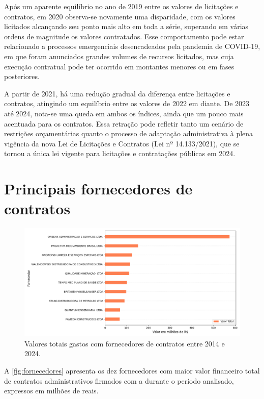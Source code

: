 \documentclass[
	12pt,				%
	oneside,			%
	a4paper,			%
	chapter=TITLE,		%
	section=TITLE,		%
	english,			%
	brazil				%
	]{abntex2}
\begin{document}
Após um aparente equilíbrio no ano de 2019 entre os valores de licitações e contratos, em 2020 observa-se novamente uma disparidade, com os valores licitados alcançando seu ponto mais alto em toda a série, superando em várias ordens de magnitude os valores contratados. Esse comportamento pode estar relacionado a processos emergenciais desencadeados pela pandemia de COVID-19, em que foram anunciados grandes volumes de recursos licitados, mas cuja execução contratual pode ter ocorrido em montantes menores ou em fases posteriores.

A partir de 2021, há uma redução gradual da diferença entre licitações e contratos, atingindo um equilíbrio entre os valores de 2022 em diante. De 2023 até 2024, nota-se uma queda em ambos os índices, ainda que um pouco mais acentuada para os contratos. Essa retração pode refletir tanto um cenário de restrições orçamentárias quanto o processo de adaptação administrativa à plena vigência da nova Lei de Licitações e Contratos (Lei nº 14.133/2021), que se tornou a única lei vigente para licitações e contratações públicas em 2024.

\section*{Principais fornecedores de contratos}

\begin{figure}[h]
	\begin{center}
		\caption{\label{fig:fornecedores}Valores totais gastos com fornecedores de contratos entre 2014 e 2024.}
		\includegraphics[scale=0.41,clip]{images/principais_fornecedores.png} %
	\end{center}
\end{figure}

A \autoref{fig:fornecedores} apresenta os dez fornecedores com maior valor financeiro total de contratos administrativos firmados com a  durante o período analisado, expressos em milhões de reais.
\end{document}
